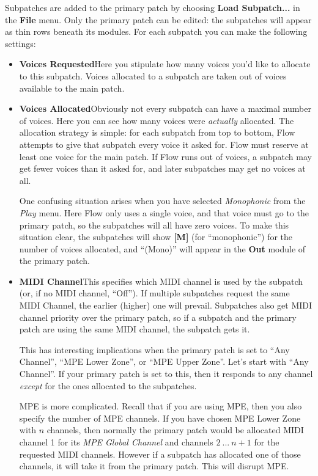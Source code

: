 \documentclass{article}
\begin{document}
Subpatches are added to the primary patch by choosing {\bf Load Subpatch...} in the {\bf File} menu.  Only the primary patch can be edited: the subpatches will appear as thin rows beneath its modules.  For each subpatch you can make the following settings:

\begin{itemize}
\item {\bf Voices Requested}\quad Here you stipulate how many voices you'd like to allocate to this subpatch.  Voices allocated to a subpatch are taken out of voices available to the main patch. 

\item {\bf Voices Allocated}\quad Obviously not every subpatch can have a maximal number of voices.  Here you can see how many voices were {\it actually} allocated.  The allocation strategy is simple: for each subpatch from top to bottom, Flow attempts to give that subpatch every voice it asked for.  Flow must reserve at least one voice for the main patch.  If Flow runs out of voices, a subpatch may get fewer voices than it asked for, and later subpatches may get no voices at all.  

One confusing situation arises when you have selected {\it Monophonic} from the {\it Play} menu.  Here Flow only uses a single voice, and that voice must go to the primary patch, so the subpatches will all have zero voices.  To make this situation clear, the subpatches will show {\bf [M]} (for ``monophonic'') for the number of voices allocated, and  ``(Mono)'' will appear in the {\bf Out} module of the primary patch.

\item {\bf MIDI Channel}\quad This specifies which MIDI channel is used by the subpatch (or, if no MIDI channel, ``Off'').  If multiple subpatches request the same MIDI Channel, the earlier (higher) one will prevail.    Subpatches also get MIDI channel priority over the primary patch, so if a subpatch and the primary patch are using the same MIDI channel, the subpatch gets it.

This has interesting implications when the primary patch is set to ``Any Channel'', ``MPE Lower Zone'', or ``MPE Upper Zone''.  Let's start with ``Any Channel''.  If your primary patch is set to this, then it responds to any channel {\it except} for the ones allocated to the subpatches.

MPE is more complicated.  Recall that if you are using MPE, then you also specify the number of MPE channels.  If you have chosen MPE Lower Zone with \(n\) channels, then normally the primary patch would be allocated MIDI channel 1 for its {\it MPE Global Channel} and channels \(2\ ...\ n + 1\) for the requested MIDI channels.  However if a subpatch has allocated one of those channels, it will take it from the primary patch.  This will disrupt MPE.


\end{itemize}
\end{document}

